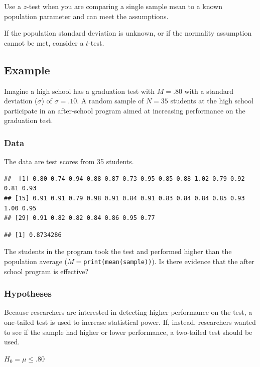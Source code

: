 \documentclass[
]{book}
\begin{document}
Use a \(z\)-test when you are comparing a single sample mean to a known population parameter and can meet the assumptions.

If the population standard deviation is unknown, or if the normality assumption cannot be met, consider a \(t\)-test.

\hypertarget{example}{%
\subsection{Example}\label{example}}

Imagine a high school has a graduation test with \(M = .80\) with a standard deviation (\(\sigma\)) of \(\sigma = .10\). A random sample of \(N = 35\) students at the high school participate in an after-school program aimed at increasing performance on the graduation test.

\hypertarget{data}{%
\subsubsection{Data}\label{data}}

The data are test scores from 35 students.

\begin{verbatim}
##  [1] 0.80 0.74 0.94 0.88 0.87 0.73 0.95 0.85 0.88 1.02 0.79 0.92 0.81 0.93
## [15] 0.91 0.91 0.79 0.98 0.91 0.84 0.91 0.83 0.84 0.84 0.85 0.93 1.00 0.95
## [29] 0.91 0.82 0.82 0.84 0.86 0.95 0.77
\end{verbatim}

\begin{verbatim}
## [1] 0.8734286
\end{verbatim}

The students in the program took the test and performed higher than the population average (\(M=\)\texttt{print(mean(sample))}). Is there evidence that the after school program is effective?

\hypertarget{hypotheses-1}{%
\subsubsection{Hypotheses}\label{hypotheses-1}}

Because researchers are interested in detecting higher performance on the test, a one-tailed test is used to increase statistical power. If, instead, researchers wanted to see if the sample had higher or lower performance, a two-tailed test should be used.

\(H_0 = \mu \le .80\)
\end{document}

